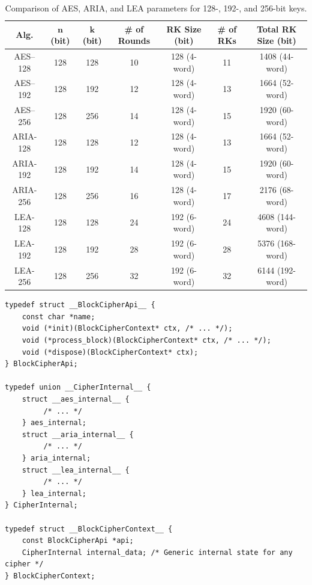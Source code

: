 \documentclass[11pt,a4paper]{report}
\theoremstyle{definitionstyle}
\begin{document}
\begin{table}[h!]
	\centering{}
	\begin{tabular*}{\textwidth}{@{\extracolsep{\fill}}ccccccc}
		\hline
		\textbf{Alg.} & $\boldsymbol{n}$ (bit) & $\boldsymbol{k}$ (bit) & \textbf{\# of Rounds} & \textbf{RK Size} (bit) & \textbf{\# of RKs} & \textbf{Total RK Size} (bit) \\
		\hline
		\textsf{AES--128} & 128 & 128 & 10 & 128 (4-word) & 11 & 1408 (44-word) \\
		\textsf{AES--192} & 128 & 192 & 12 & 128 (4-word) & 13 & 1664 (52-word)\\
		\textsf{AES--256} & 128 & 256 & 14 & 128 (4-word) & 15 & 1920 (60-word)\\
		\hline
		\textsf{ARIA-128} & 128 & 128 & 12 & 128 (4-word) & 13 & 1664 (52-word)\\
		\textsf{ARIA-192} & 128 & 192 & 14 & 128 (4-word) & 15 & 1920 (60-word)\\
		\textsf{ARIA-256} & 128 & 256 & 16 & 128 (4-word) & 17 & 2176 (68-word)\\
		\hline
		\textsf{LEA-128} & 128 & 128 & 24 & 192 (6-word) & 24 & 4608 (144-word)\\
		\textsf{LEA-192} & 128 & 192 & 28 & 192 (6-word) & 28 & 5376 (168-word)\\
		\textsf{LEA-256} & 128 & 256 & 32 & 192 (6-word) & 32 & 6144 (192-word)\\
		\hline
	\end{tabular*}
	\caption{Comparison of AES, ARIA, and LEA parameters for 128-, 192-, and 256-bit keys. 
	}
	\label{tab:cipher-comparison}
\end{table}
\newpage
\begin{lstlisting}[style=cstyle]
typedef struct __BlockCipherApi__ {
	const char *name;
	void (*init)(BlockCipherContext* ctx, /* ... */);
	void (*process_block)(BlockCipherContext* ctx, /* ... */);
	void (*dispose)(BlockCipherContext* ctx);
} BlockCipherApi;

typedef union __CipherInternal__ {
	struct __aes_internal__ {
		 /* ... */
	} aes_internal;
	struct __aria_internal__ {
		 /* ... */ 
	} aria_internal;
	struct __lea_internal__ {
		 /* ... */
	} lea_internal;
} CipherInternal;

typedef struct __BlockCipherContext__ {
	const BlockCipherApi *api;  
	CipherInternal internal_data; /* Generic internal state for any cipher */
} BlockCipherContext;
\end{lstlisting}
\begin{figure}[h!]

\end{figure}
\end{document}

